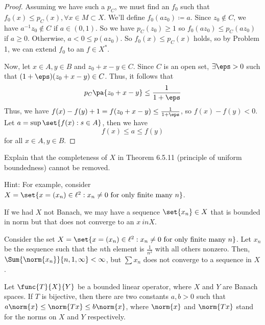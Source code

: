 \documentclass[12pt,letterpaper,twoside]{hmcpset}
\begin{document}
\begin{solution}
  \begin{proof}
    Assuming we have such a $p_C$, we must find an $f_0$ such that $f_0(x) \leq p_C(x), \forall x \in M \subset X$.
    We'll define $f_0(a z_0) \coloneqq a$.
    Since $z_0 \not\in C$, we have $a^{-1}z_0 \not\in C$ if $a \in (0,1)$.
    So we have $p_C(z_0) \geq 1$ so $f_0(az_0) \leq p_C(az_0)$ if $a \geq 0$.
    Otherwise, $a < 0 \leq p(az_0)$.
    So $f_0(x) \leq p_C(x)$ holds, so by Problem 1, we can extend $f_0$ to an $f \in X^*$.

    Now, let $x \in A, y \in B$ and $z_0 + x - y \in C$.
    Since $C$ is an open set, $\exists \eps > 0$ such that $(1 + \eps)(z_0 + x - y) \in C$.
    Thus, it follows that  \[
    p_C\pa{z_0 + x - y} \leq \frac{1}{1 + \eps}
    \]
    Thus, we have $f(x) - f(y) +1 = f(z_0 + x -y) \leq \frac{1}{1 + \eps}$, so $f(x) - f(y) < 0$.
    Let $a = \sup\set{f(x) : s \in A}$, then we have \[
    f(x) \leq a \leq f(y)
    \]
    for all $x \in A, y \in B$.
  \end{proof}
\end{solution}

\begin{problem}[3]
  Explain that the completeness of $X$ in Theorem 6.5.11 (principle of uniform boundedness) cannot be removed.

  Hint: For example, consider $X = \set{x = (x_{n}) \in \ell^{2} : x_{n} \neq 0 \text{ for only finite many } n}$.
\end{problem}

\begin{solution}
  If we had $X$ not Banach, we may have a sequence $\set{x_n} \in X$ that is bounded in norm but that does not converge to an $x \ in X$.

Consider the set $X = \set{x = (x_{n}) \in \ell^{2} : x_{n} \neq 0 \text{ for only finite many } n}$.  
Let $x_n$ be the sequence such that the $n$th element is $\frac{1}{n^2}$ with all others nonzero.
Then, $\Sum{\norm{x_n}}{n,1,\infty} < \infty$, but $\sum{x_n}$ does not converge to a sequence in $X$.
\end{solution}
\begin{problem}[4]
  Let $\func{T}{X}{Y}$ be a bounded linear operator, where $X$ and $Y$ are Banach spaces.  
  If $T$ is bijective, then there are two constants $a,b > 0$ such that $a\norm{x} \leq \norm{Tx} \leq b\norm{x}$, where $\norm{x}$ and $\norm{Tx}$ stand for the norms on $X$ and $Y$ respectively.
\end{problem}
\end{document}

